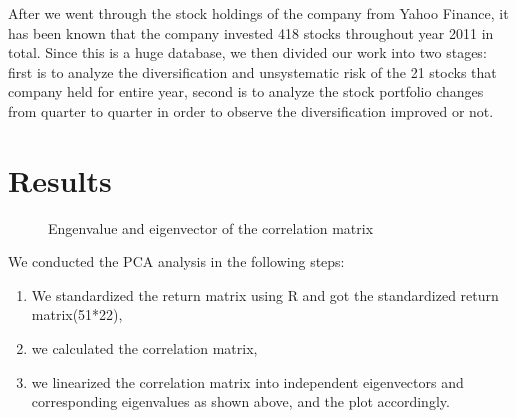 \documentclass[oneside,12pt]{report}
\begin{document}
After we went through the stock holdings of the company from Yahoo Finance, it has been known that the company invested 418 stocks throughout year 2011 in total. Since this is a huge database, we then divided our work into two stages: first is to analyze the diversification and unsystematic risk of the 21 stocks that company held for entire year, second is to analyze the stock portfolio changes from quarter to quarter in order to observe the diversification improved or not. 


\chapter{Results}\label{Results}
\begin{figure}[ht]
\centering
{}
\caption[Optional caption for list of figures]{Engenvalue and eigenvector of the correlation matrix}
\label{fig:subfigureExample}
\end{figure}
We conducted the PCA analysis in the following steps:
\begin{enumerate}
\item We standardized the return matrix using R and got the standardized return matrix(51*22),
\item we calculated the correlation matrix,
\item we linearized the correlation matrix into independent eigenvectors and corresponding eigenvalues as shown above, and the plot accordingly.
\end{enumerate}
\end{document}
